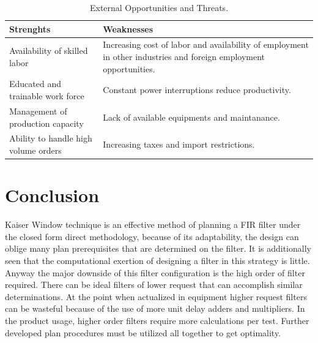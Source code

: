 \documentclass[twoside,12pt,times,onecolumn,a4paper]{report}
\begin{document}
\begin{table}[!h]
\centering


 \begin{tabular}{||p{}|p{}||}
 \hline
 Strenghts &  Weaknesses \\ [0.5ex] 
 \hline\hline
 Availability of skilled labor & Increasing cost of labor and availability of employment in other industries and foreign employment opportunities. \\ 
 \hline
 Educated and trainable work force & Constant power interruptions reduce productivity.  \\
 \hline
Management of production capacity  & Lack of available equipments and maintanance.  \\  
 \hline
Ability to handle high volume orders & Increasing taxes and import restrictions.  \\ [1ex]
\hline
 \end{tabular}
\caption{External Opportunities and Threats.}
\label{tab:table1}
\end{table}




\chapter{Conclusion}
\hspace{4em}Kaiser Window technique is an effective method of planning a FIR filter under the closed form direct methodology, because of its adaptability, the design can oblige many plan prerequisites that are determined on the filter. It  is additionally seen that the computational exertion of designing a filter in this strategy is little. Anyway the major downside of this filter configuration is the high order of filter required. There can be ideal filters of lower request that can accomplish similar determinations. At the point when actualized in equipment higher request filters can be wasteful because of the use of more unit delay adders and multipliers. In the product usage, higher order filters require more calculations per test. Further developed plan procedures must be utilized all together to get optimality.




\medskip

\appendix


\end{document}
